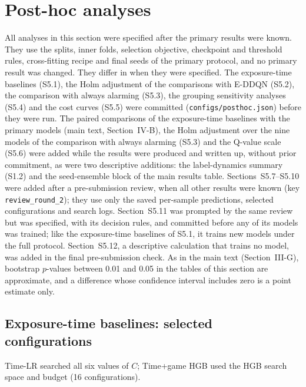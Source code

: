 \section{Post-hoc analyses}
\label{sec:s-posthoc}
All analyses in this section were specified after the primary results were known. They use the splits, inner folds, selection objective, checkpoint and threshold rules, cross-fitting recipe and final seeds of the primary protocol, and no primary result was changed. They differ in when they were specified. The exposure-time baselines (S5.1), the Holm adjustment of the comparisons with E-DDQN (S5.2), the comparison with always alarming (S5.3), the grouping sensitivity analyses (S5.4) and the cost curves (S5.5) were committed (\texttt{configs/\allowbreak posthoc.json}) before they were run. The paired comparisons of the exposure-time baselines with the primary models (main text, Section~IV-B), the Holm adjustment over the nine models of the comparison with always alarming (S5.3) and the Q-value scale (S5.6) were added while the results were produced and written up, without prior commitment, as were two descriptive additions: the label-dynamics summary (S1.2) and the seed-ensemble block of the main results table. Sections~S5.7--S5.10 were added after a pre-submission review, when all other results were known (key \texttt{review\_round\_2}); they use only the saved per-sample predictions, selected configurations and search logs. Section~S5.11 was prompted by the same review but was specified, with its decision rules, and committed before any of its models was trained; like the exposure-time baselines of S5.1, it trains new models under the full protocol. Section~S5.12, a descriptive calculation that trains no model, was added in the final pre-submission check. As in the main text (Section~III-G), bootstrap $p$-values between 0.01 and 0.05 in the tables of this section are approximate, and a difference whose confidence interval includes zero is a point estimate only.

\subsection{Exposure-time baselines: selected configurations}
Time-LR searched all six values of $C$; Time+game HGB used the HGB search space and budget (16 configurations).

\begin{center}\footnotesize

\end{center}


